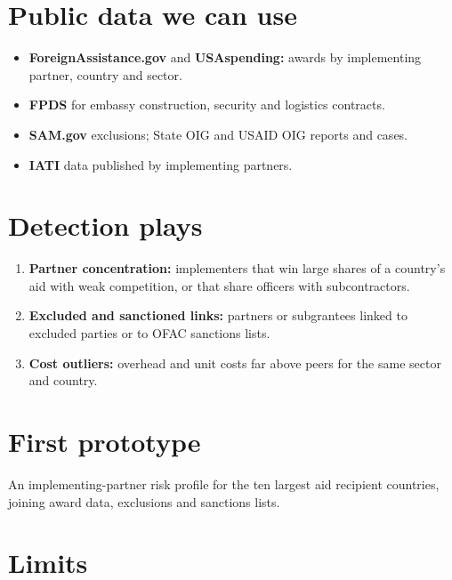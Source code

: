 \documentclass[letterpaper,11pt]{article}
\providecommand{\tightlist}{\setlength{\itemsep}{0pt}\setlength{\parskip}{0pt}}
\begin{document}
\hypertarget{public-data-we-can-use}{%
\section{Public data we can use}\label{public-data-we-can-use}}

\begin{itemize}
\tightlist
\item
  \textbf{ForeignAssistance.gov} and \textbf{USAspending:} awards by
  implementing partner, country and sector.
\item
  \textbf{FPDS} for embassy construction, security and logistics
  contracts.
\item
  \textbf{SAM.gov} exclusions; State OIG and USAID OIG reports and
  cases.
\item
  \textbf{IATI} data published by implementing partners.
\end{itemize}

\hypertarget{detection-plays}{%
\section{Detection plays}\label{detection-plays}}

\begin{enumerate}
\def\labelenumi{\arabic{enumi}.}
\tightlist
\item
  \textbf{Partner concentration:} implementers that win large shares of
  a country's aid with weak competition, or that share officers with
  subcontractors.
\item
  \textbf{Excluded and sanctioned links:} partners or subgrantees linked
  to excluded parties or to OFAC sanctions lists.
\item
  \textbf{Cost outliers:} overhead and unit costs far above peers for
  the same sector and country.
\end{enumerate}

\hypertarget{first-prototype}{%
\section{First prototype}\label{first-prototype}}

An implementing-partner risk profile for the ten largest aid recipient
countries, joining award data, exclusions and sanctions lists.

\hypertarget{limits}{%
\section{Limits}\label{limits}}
\end{document}
